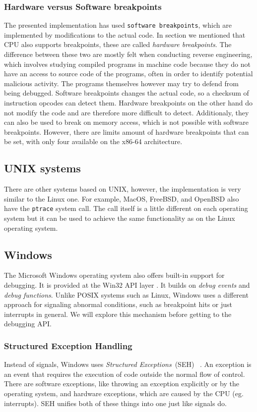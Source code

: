 \subsubsection*{Hardware versus Software breakpoints}
The presented implementation has used \texttt{software breakpoints}, which are
implemented by modifications to the actual code. In section
 we mentioned that CPU also supports
breakpoints, these are called \textit{hardware breakpoints}. The difference
between these two are mostly felt when conducting reverse engineering, which
involves studying compiled programs in machine code because they do not have an
access to source code of the programs, often in order to identify potential
malicious activity. The programs themselves however may try to defend from
being debugged. Software breakpoints changes the actual code, so a checksum of
instruction opcodes can detect them. Hardware breakpoints on the other hand do
not modify the code and are therefore more difficult to detect. Additionaly,
they can also be used to break on memory access, which is not possible with
software breakpoints. However, there are limits amount of hardware breakpoints
that can be set, with only four available on the x86-64 architecture.

\subsection{UNIX systems}
There are other systems based on UNIX, however, the implementation is very
similar to the Linux one. For example, MacOS, FreeBSD, and OpenBSD also have
the \texttt{ptrace} system call. The call itself is a little different on each
operating system but it can be used to achieve the same functionality as on the
Linux operating system.

\subsection{Windows}
The Microsoft Windows operating system also offers built-in support for
debugging. It is provided at the Win32 API layer
\cite{windows-msdn-debugging-api, windows-press-debugging-api}. It builds on
\textit{debug events} and \textit{debug functions}. Unlike POSIX systems such
as Linux, Windows uses a different approach for signaling abnormal conditions,
such as breakpoint hits or just interrupts in general. We will explore this
mechanism before getting to the debugging API.

\subsubsection*{Structured Exception Handling}
Instead of signals, Windows uses \textit{Structured Exceptions}~(SEH)~
\cite{windows-msdn-seh}. An exception is an event that requires the execution
of code outside the normal flow of control. There are software exceptions, like
throwing an exception explicitly or by the operating system, and hardware
exceptions, which are caused by the CPU (eg. interrupts). SEH unifies both of
these things into one just like signals do.

